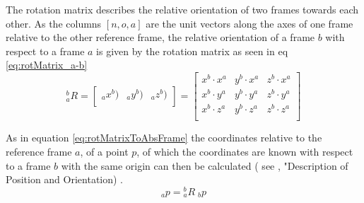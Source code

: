 The rotation matrix describes the relative orientation of two frames towards each other. As the columns $[n,o,a]$ are the unit vectors along the axes of one frame relative to the other reference frame, the relative orientation of a frame ${b}$ with respect to a frame ${a}$ is given by the rotation matrix as seen in eq \ref{eq:rotMatrix_a-b} \cite{ConstantinForwardKA}
\begin{equation}
\phantom{}^b_aR =
\begin{bmatrix}
\phantom{}_ax^b) & \phantom{}_ay^b) & \phantom{}_az^b) \\
\end{bmatrix}
=
\begin{bmatrix}
x^b \cdot x^a & y^b \cdot x^a & z^b \cdot x^a \\
x^b \cdot y^a & y^b \cdot y^a & z^b \cdot y^a \\
x^b \cdot z^a & y^b \cdot z^a & z^b \cdot z^a \\
\end{bmatrix}
\end{equation}

As in equation \ref{eq:rotMatrixToAbsFrame} the coordinates relative to the reference frame ${a}$, of a point $p$, of which the coordinates are known with respect to a frame ${b}$ with the same origin can then be calculated ( see \cite{RobotKinemDyn}, "Description of Position and Orientation) .
\begin{equation}\label{eq:rotMatrixToAbsFrame}
\phantom{}_a p = \phantom{}^b_aR\phantom{.}_b p 
\end{equation}


